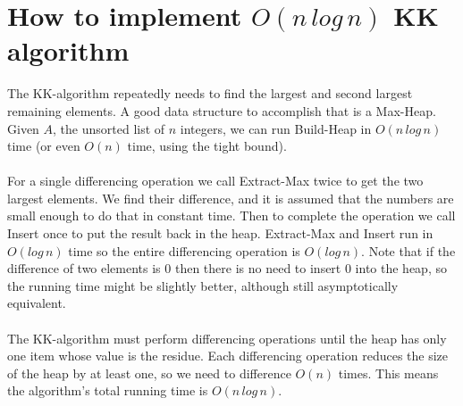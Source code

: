\documentclass[11pt]{article}
\begin{document}
\section{How to implement $O(n\,log\,n)$ KK algorithm}
The KK-algorithm repeatedly needs to find the largest and second largest remaining elements. A good data structure to accomplish that is a Max-Heap. Given $A$, the unsorted list of $n$ integers, we can run Build-Heap in $O(n\,log\,n)$ time (or even $O(n)$ time, using the tight bound). \\
\\
For a single differencing operation we call Extract-Max twice to get the two largest elements. We find their difference, and it is assumed that the numbers are small enough to do that in constant time. Then to complete the operation we call Insert once to put the result back in the heap. Extract-Max and Insert run in $O(log\,n)$ time so the entire differencing operation is $O(log\,n)$. Note that if the difference of two elements is 0 then there is no need to insert 0 into the heap, so the running time might be slightly better, although still asymptotically equivalent.\\
\\
The KK-algorithm must perform differencing operations until the heap has only one item whose value is the residue. Each differencing operation reduces the size of the heap by at least one, so we need to difference $O(n)$ times. This means the algorithm's total running time is $O(n\,log\,n)$.
\\
\\
\newpage
\end{document}

